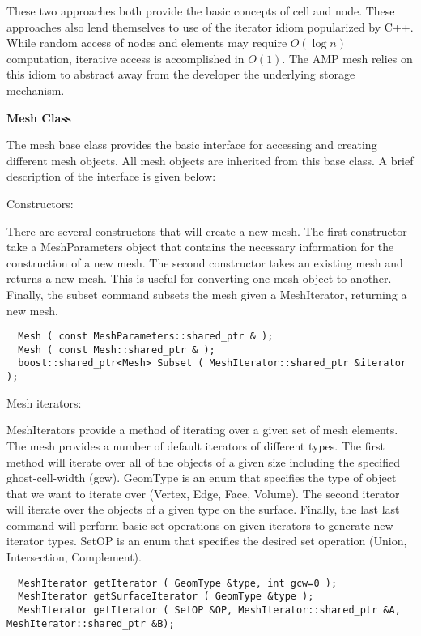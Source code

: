 \documentclass[10pt]{article}
\newenvironment{codelisting}
{\begin{list}{}{\setlength{\leftmargin}{2em}}\item\scriptsize\normalsize}
{\end{list}}
\begin{document}
These two approaches both provide the basic concepts of cell and node.  These approaches also lend themselves to use of the iterator idiom popularized by C++.  While random access of nodes and elements may require $O(\log n)$ computation, iterative access is accomplished in $O(1)$.  The {AMP} mesh relies on this idiom to abstract away from the developer the underlying storage mechanism.


\vspace{6 mm}\noindent\textbf{Mesh Class}

The mesh base class provides the basic interface for accessing and creating different mesh objects.  All mesh objects are inherited from this base class.  A brief description of the interface is given below:

\vspace{3 mm}\linebreak
\par
\noindent Constructors:
\par
There are several constructors that will create a new mesh.  The first constructor take a MeshParameters object that contains the necessary information for the construction of a new mesh.  The second constructor takes an existing mesh and returns a new mesh.  This is useful for converting one mesh object to another.  Finally, the subset command subsets the mesh given a MeshIterator, returning a new mesh.
\begin{codelisting}
\begin{verbatim}
  Mesh ( const MeshParameters::shared_ptr & );
  Mesh ( const Mesh::shared_ptr & );
  boost::shared_ptr<Mesh> Subset ( MeshIterator::shared_ptr &iterator );
\end{verbatim}
\end{codelisting}

\vspace{2 mm}\linebreak
\par
\noindent Mesh iterators:
\par
MeshIterators provide a method of iterating over a given set of mesh elements.  The mesh provides a number of default iterators of different types.  The first method will iterate over all of the objects of a given size including the specified ghost-cell-width (gcw).  GeomType is an enum that specifies the type of object that we want to iterate over (Vertex, Edge, Face, Volume).  The second iterator will iterate over the objects of a given type on the surface.  Finally, the last last command will perform basic set operations on given iterators to generate new iterator types.  SetOP is an enum that specifies the desired set operation (Union, Intersection, Complement).  
\begin{codelisting}
\begin{verbatim}
  MeshIterator getIterator ( GeomType &type, int gcw=0 );
  MeshIterator getSurfaceIterator ( GeomType &type );
  MeshIterator getIterator ( SetOP &OP, MeshIterator::shared_ptr &A, MeshIterator::shared_ptr &B);
\end{verbatim}
\end{codelisting}
\end{document}
